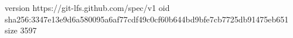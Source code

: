 version https://git-lfs.github.com/spec/v1
oid sha256:3347e13e9d6a580095a6af77cdf49c0cf60b644bd9bfe7cb7725db91475eb651
size 3597
